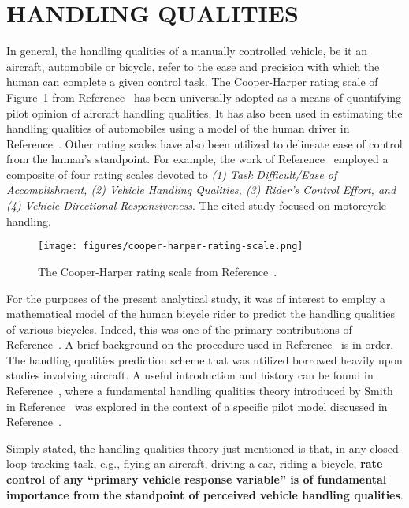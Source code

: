 \documentclass{bmd2016p}
\begin{document}
\section{HANDLING QUALITIES}
%
In general, the handling qualities of a manually controlled vehicle, be it an
aircraft, automobile or bicycle, refer to the ease and precision with which the
human can complete a given control task. The Cooper-Harper rating scale of
Figure~\ref{fig:cooper-harper-rating-scale} from Reference~\cite{Cooper1969} has
been universally adopted as a means of quantifying pilot opinion of aircraft
handling qualities. It has also been used in estimating the handling qualities
of automobiles using a model of the human driver in
Reference~\cite{Modjtahedzadeh1993}. Other rating scales have also been
utilized to delineate ease of control from the human's standpoint. For example,
the work of Reference~\cite{Weir1978} employed a composite of four rating
scales devoted to \textit{(1) Task Difficult/Ease of Accomplishment, (2)
Vehicle Handling Qualities, (3) Rider's Control Effort, and (4) Vehicle
Directional Responsiveness}. The cited study focused on motorcycle handling.
%
\begin{figure}
  \centering
  \texttt{[image: figures/cooper-harper-rating-scale.png]}
  \caption{The Cooper-Harper rating scale from Reference~\cite{Cooper1969}.}
  \label{fig:cooper-harper-rating-scale}
\end{figure}

For the purposes of the present analytical study, it was of interest to employ
a mathematical model of the human bicycle rider to predict the handling
qualities of various bicycles. Indeed, this was one of the primary
contributions of Reference~\cite{Hess2012}. A brief background on the procedure
used in Reference~\cite{Hess2012} is in order. The handling qualities
prediction scheme that was utilized borrowed heavily upon studies involving
aircraft. A useful introduction and history can be found in
Reference~\cite{Hess1990}, where a fundamental handling qualities theory
introduced by Smith in Reference~\cite{Smith1976} was explored in the context
of a specific pilot model discussed in Reference~\cite{Hess1985}. 

Simply stated,
the handling qualities theory just mentioned is that, in any closed-loop
tracking task, e.g., flying an aircraft, driving a car, riding a bicycle, \textbf{rate
control of any ``primary vehicle response variable'' is of fundamental
importance from the standpoint of perceived vehicle handling qualities}.
\end{document}
